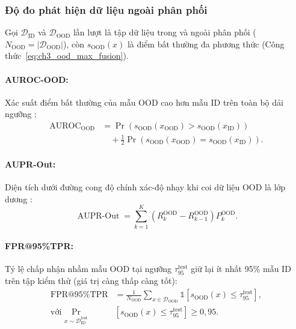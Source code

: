 \subsubsection{Độ đo phát hiện dữ liệu ngoài phân phối}

Gọi $\mathcal{D}_{\mathrm{ID}}$ và $\mathcal{D}_{\mathrm{OOD}}$ lần lượt là tập dữ liệu trong và ngoài phân phối ($N_{\mathrm{OOD}}=|\mathcal{D}_{\mathrm{OOD}}|$), còn $s_{\mathrm{OOD}}(x)$ là điểm bất thường đa phương thức (Công thức~\ref{eq:ch3_ood_max_fusion}).

\paragraph{AUROC-OOD:} Xác suất điểm bất thường của mẫu OOD cao hơn mẫu ID trên toàn bộ dải ngưỡng \cite{Hendrycks2017MSP}:
\begin{equation}
\begin{aligned}
\operatorname{AUROC}_{\mathrm{OOD}}
&=\Pr\!\left(
s_{\mathrm{OOD}}(x_{\mathrm{OOD}})>s_{\mathrm{OOD}}(x_{\mathrm{ID}})
\right) \\
&\quad+\frac{1}{2}\Pr\!\left(
s_{\mathrm{OOD}}(x_{\mathrm{OOD}})=s_{\mathrm{OOD}}(x_{\mathrm{ID}})
\right).
\end{aligned}
\label{eq:ch4_auroc_ood}
\end{equation}

\paragraph{AUPR-Out:} Diện tích dưới đường cong độ chính xác-độ nhạy khi coi dữ liệu OOD là lớp dương \cite{Hendrycks2017MSP,Liang2018ODIN}:
\begin{equation}
\operatorname{AUPR\text{-}Out}
=\sum_{k=1}^{K}
\left(R^{\mathrm{OOD}}_k-R^{\mathrm{OOD}}_{k-1}\right)
P^{\mathrm{OOD}}_k.
\label{eq:ch4_aupr_out}
\end{equation}

\pagebreak

\paragraph{FPR@95\%TPR:} Tỷ lệ chấp nhận nhầm mẫu OOD tại ngưỡng $\tau_{95}^{\mathrm{test}}$ giữ lại ít nhất 95\% mẫu ID trên tập kiểm thử \cite{Liang2018ODIN,Liu2020EnergyOOD} (giá trị càng thấp càng tốt):
\begin{equation}
\begin{aligned}
\operatorname{FPR@95\%TPR}
&=\frac{1}{N_{\mathrm{OOD}}}\sum_{x\in\mathcal{D}_{\mathrm{OOD}}}
\mathbb{1}\!\left[s_{\mathrm{OOD}}(x)\leq\tau_{95}^{\mathrm{test}}\right],\\
\text{với } \Pr_{x\sim\mathcal{D}_{\mathrm{ID}}^{\mathrm{test}}}
&\!\left[s_{\mathrm{OOD}}(x)\leq\tau_{95}^{\mathrm{test}}\right]\geq0{,}95.
\end{aligned}
\label{eq:ch4_fpr95}
\end{equation}

